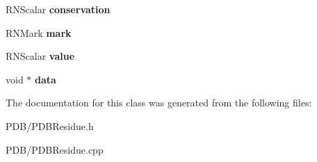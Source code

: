 \begin{DoxyCompactItemize}
\item 
R\+N\+Scalar {\bfseries conservation}\hypertarget{class_p_d_b_residue_ae518652e84638f11dfbf0eeab14f47fb}{}\label{class_p_d_b_residue_ae518652e84638f11dfbf0eeab14f47fb}

\item 
R\+N\+Mark {\bfseries mark}\hypertarget{class_p_d_b_residue_a4d1ddefca1be7dfa4953d55ab6598d3a}{}\label{class_p_d_b_residue_a4d1ddefca1be7dfa4953d55ab6598d3a}

\item 
R\+N\+Scalar {\bfseries value}\hypertarget{class_p_d_b_residue_a2545d5ddadb0770cc37fc5b348068eb0}{}\label{class_p_d_b_residue_a2545d5ddadb0770cc37fc5b348068eb0}

\item 
void $\ast$ {\bfseries data}\hypertarget{class_p_d_b_residue_a3ce9258f60a9d8e066b4b7d40d3a45a7}{}\label{class_p_d_b_residue_a3ce9258f60a9d8e066b4b7d40d3a45a7}

\end{DoxyCompactItemize}


The documentation for this class was generated from the following files\+:\begin{DoxyCompactItemize}
\item 
P\+D\+B/P\+D\+B\+Residue.\+h\item 
P\+D\+B/P\+D\+B\+Residue.\+cpp\end{DoxyCompactItemize}
